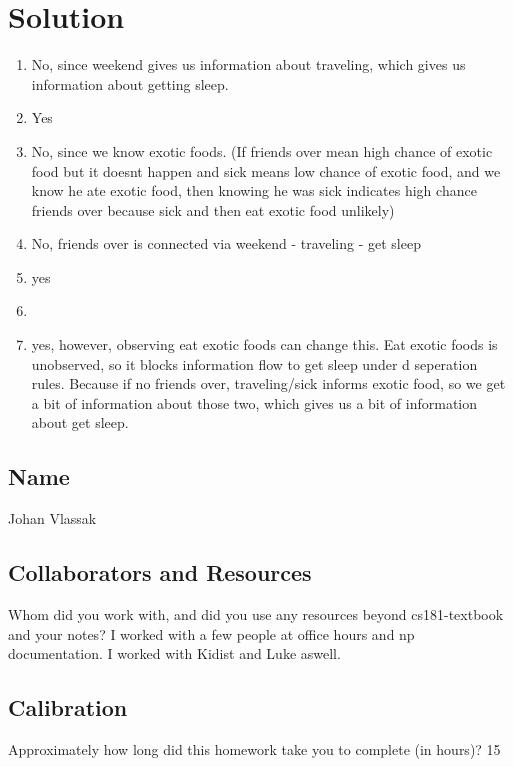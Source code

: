 \documentclass[submit]{harvardml}
\newcommand{\attr}[1]{\textsf{#1}}
\begin{document}
\newpage
\section*{Solution}
\begin{enumerate}
  \item No, since weekend gives us information about traveling, which gives us information about getting sleep.
  \item Yes
  \item No, since we know exotic foods. (If friends over mean high chance of exotic food but it doesnt happen and sick means low chance of exotic food, and we know he ate exotic food, then knowing he was sick indicates high chance friends over because sick and then eat exotic food unlikely)
  \item No, friends over is connected via weekend - traveling - get sleep
  \item yes
  \item \begin{center}
\end{center}
  \item 
  yes, however, observing eat exotic foods can change this. Eat exotic foods is unobserved, so it blocks information flow to get sleep under d seperation rules.  Because if no friends over, traveling/sick informs exotic food, so we get a bit of information about those two, which gives us a bit of information about get sleep. 
\end{enumerate}

\newpage
\subsection*{Name}
Johan Vlassak

\subsection*{Collaborators and Resources}
Whom did you work with, and did you use any resources beyond cs181-textbook and your notes?
I worked with a few people at office hours and np documentation. I worked with Kidist and Luke aswell. 
\subsection*{Calibration}
Approximately how long did this homework take you to complete (in hours)? 
15
\end{document}
